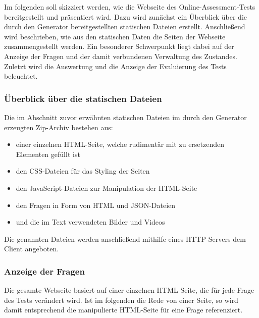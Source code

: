 \label{Jena}

Im folgenden soll skizziert werden, wie die Webseite des Online-Assessment-Tests bereitgestellt und präsentiert wird.
Dazu wird zunächst ein Überblick über die durch den Generator bereitgestellten statischen Dateien erstellt. Anschließend wird beschrieben, wie aus den statischen Daten die Seiten der Webseite zusammengestellt werden.
Ein besonderer Schwerpunkt liegt dabei auf der Anzeige der Fragen und der damit verbundenen Verwaltung des Zustandes.
Zuletzt wird die Auswertung und die Anzeige der Evaluierung des Tests beleuchtet.

\subsubsection{Überblick über die statischen Dateien}

Die im Abschnitt zuvor erwähnten statischen Dateien im durch den Generator erzeugten Zip-Archiv bestehen aus:

\begin{itemize}
\item einer einzelnen HTML-Seite, welche rudimentär mit zu ersetzenden Elementen gefüllt ist

\item den CSS-Dateien für das Styling der Seiten

\item den JavaScript-Dateien zur Manipulation der HTML-Seite 

\item den Fragen in Form von HTML und JSON-Dateien

\item und die im Text verwendeten Bilder und Videos
\end{itemize}

Die genannten Dateien werden anschließend mithilfe eines HTTP-Servers dem Client angeboten. 

\subsubsection{Anzeige der Fragen}

Die gesamte Webseite basiert auf einer einzelnen HTML-Seite, die für jede Frage des Tests verändert wird.
Ist im folgenden die Rede von einer Seite, so wird damit entsprechend die manipulierte HTML-Seite für eine Frage referenziert.

